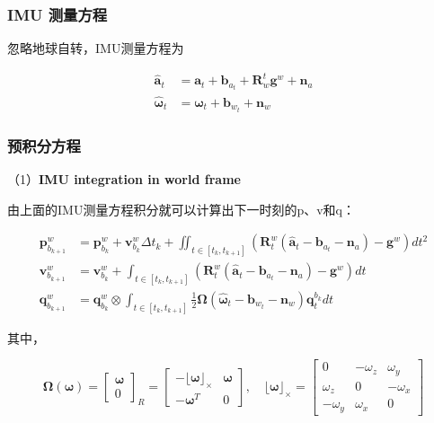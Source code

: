 \documentclass[12pt,a4paper]{article}
\begin{document}
\subsubsection{IMU 测量方程}

忽略地球自转，IMU测量方程为

\begin{equation}
\begin{aligned} 
\hat{\mathbf{a}}_{t} 
&= 
\mathbf{a}_{t}+\mathbf{b}_{a_{t}}+\mathbf{R}_{w}^{t} \mathbf{g}^{w}+\mathbf{n}_{a} \\ 
\hat{\boldsymbol{\omega}}_{t} 
&=
\boldsymbol{\omega}_{t}+\mathbf{b}_{w_{t}}+\mathbf{n}_{w} 
\end{aligned}
\end{equation}

\subsubsection{预积分方程}

（1）\textbf{IMU integration in world frame}

由上面的IMU测量方程积分就可以计算出下一时刻的p、v和q：  

\begin{equation}
\begin{aligned} 
\mathbf{p}_{b_{k+1}}^{w}&=
\mathbf{p}_{b_{k}}^{w} + \mathbf{v}_{b_{k}}^{w} \Delta t_{k} + \iint_{t \in\left[t_{k}, t_{k+1}\right]}\left(\mathbf{R}_{t}^{w}\left(\hat{\mathbf{a}}_{t}-\mathbf{b}_{a_{t}}-\mathbf{n}_{a}\right)-\mathbf{g}^{w}\right) d t^{2} \\ 
\mathbf{v}_{b_{k+1}}^{w}&=
\mathbf{v}_{b_{k}}^{w}+\int_{t \in\left[t_{k}, t_{k+1}\right]}\left(\mathbf{R}_{t}^{w}\left(\hat{\mathbf{a}}_{t}-\mathbf{b}_{a_{t}}-\mathbf{n}_{a}\right)-\mathbf{g}^{w}\right) d t \\
\mathbf{q}_{b_{k+1}}^{w}&=
\mathbf{q}_{b_{k}}^{w} \otimes \int_{t \in\left[t_{k}, t_{k+1}\right]} \frac{1}{2} \boldsymbol{\Omega}\left(\hat{\boldsymbol{\omega}}_{t}-\mathbf{b}_{w_{t}}-\mathbf{n}_{w}\right) \mathbf{q}_{t}^{b_{k}} d t
\end{aligned}
\end{equation}

其中，

\begin{equation}
\boldsymbol{\Omega}(\boldsymbol{\omega}) =
\left[\begin{array}{c}
\boldsymbol{\omega} \\ 0
\end{array}\right]_{R} = 
\left[\begin{array}{cc}
{-\lfloor\boldsymbol{\omega}\rfloor_{ \times}} & {\boldsymbol{\omega}} \\ 
{-\boldsymbol{\omega}^{T}} & {0}
\end{array}\right], \quad
\lfloor\boldsymbol{\omega}\rfloor_{ \times}=
\left[\begin{array}{ccc}
{0} & {-\omega_{z}} & {\omega_{y}} \\ 
{\omega_{z}} & {0} & {-\omega_{x}} \\ 
{-\omega_{y}} & {\omega_{x}} & {0}
\end{array}\right]
\end{equation}
\end{document}
